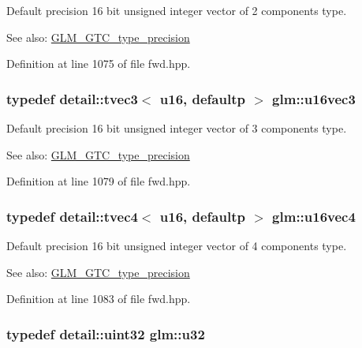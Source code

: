 Default precision 16 bit unsigned integer vector of 2 components type. \begin{Desc}
\item[See also:]\hyperlink{group__gtc__type__precision}{GLM\_\-GTC\_\-type\_\-precision} \end{Desc}


Definition at line 1075 of file fwd.hpp.\hypertarget{group__gtc__type__precision_g372e1184da616b77fcbd48b8c166c24a}{
\subsubsection[u16vec3]{\setlength{\rightskip}{0pt plus 5cm}typedef detail::tvec3$<$ u16, defaultp $>$ {\bf glm::u16vec3}}}
\label{group__gtc__type__precision_g372e1184da616b77fcbd48b8c166c24a}


Default precision 16 bit unsigned integer vector of 3 components type. \begin{Desc}
\item[See also:]\hyperlink{group__gtc__type__precision}{GLM\_\-GTC\_\-type\_\-precision} \end{Desc}


Definition at line 1079 of file fwd.hpp.\hypertarget{group__gtc__type__precision_gac02cce8820bcdbbeea9659aeaa718fb}{
\subsubsection[u16vec4]{\setlength{\rightskip}{0pt plus 5cm}typedef detail::tvec4$<$ u16, defaultp $>$ {\bf glm::u16vec4}}}
\label{group__gtc__type__precision_gac02cce8820bcdbbeea9659aeaa718fb}


Default precision 16 bit unsigned integer vector of 4 components type. \begin{Desc}
\item[See also:]\hyperlink{group__gtc__type__precision}{GLM\_\-GTC\_\-type\_\-precision} \end{Desc}


Definition at line 1083 of file fwd.hpp.\hypertarget{group__gtc__type__precision_g54e837745059fd29017bed71cfa0a8db}{
\subsubsection[u32]{\setlength{\rightskip}{0pt plus 5cm}typedef detail::uint32 {\bf glm::u32}}}
\label{group__gtc__type__precision_g54e837745059fd29017bed71cfa0a8db}


